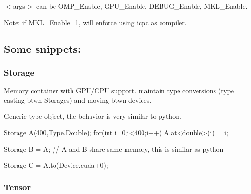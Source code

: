 $<$args$>$ can be O\+M\+P\+\_\+\+Enable, G\+P\+U\+\_\+\+Enable, D\+E\+B\+U\+G\+\_\+\+Enable, M\+K\+L\+\_\+\+Enable.

Note\+: if M\+K\+L\+\_\+\+Enable=1, will enforce using icpc as compiler.

\subsection*{Some snippets\+:}

\subsubsection*{Storage}


\begin{DoxyItemize}
\item Memory container with G\+P\+U/\+C\+PU support. maintain type conversions (type casting btwn Storages) and moving btwn devices.
\item Generic type object, the behavior is very similar to python. 
\begin{DoxyCode}
Storage A(400,Type.Double);
\textcolor{keywordflow}{for}(\textcolor{keywordtype}{int} i=0;i<400;i++)
    A.at<\textcolor{keywordtype}{double}>(i) = i;

Storage B = A; \textcolor{comment}{// A and B share same memory, this is similar as python }

Storage C = A.to(Device.cuda+0); 
\end{DoxyCode}

\end{DoxyItemize}

\subsubsection*{Tensor}


